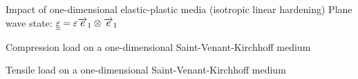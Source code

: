 \begin{frame}{}
  \begin{block}{Impact of one-dimensional elastic-plastic media \cite{Thomas_EP} (isotropic linear hardening)}
    Plane wave state: ${\underline{\underline{\varepsilon}}}=\varepsilon {\overrightarrow{e}}_1 \otimes {\overrightarrow{e}}_1$ 
  \end{block}
  \centering
  
\end{frame}

\begin{frame}
  \begin{block}{Compression load on a one-dimensional Saint-Venant-Kirchhoff medium \cite{DGMPM}}
    \centering
    
    
  \end{block}
\end{frame}

\begin{frame}
  \begin{block}{Tensile load on a one-dimensional Saint-Venant-Kirchhoff medium \cite{DGMPM}}
    \centering
    
    
  \end{block}
\end{frame}





